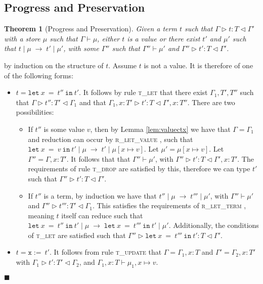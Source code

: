 \documentclass{article}
\newtheorem{thm}{Theorem}
\newcommand{\lemref}[1]{Lemma \ref{#1}}
\newcommand{\rlett}{\textsc{r\_let\_term} }
\newcommand{\rletv}{\textsc{r\_let\_value} }
\newcommand{\tlet}{\textsc{t\_let} }
\newcommand{\tupd}{\textsc{t\_update} }
\newcommand{\tdrop}{\textsc{t\_drop} }
\newcommand{\typerule}[4]{#1 \triangleright #2 : #3 \triangleleft #4}
\newcommand{\oprule}[4]{#1 \mid #2\;\longrightarrow\;#3 \mid #4}
\newcommand{\lett}[3]{\mathtt{let}\:#1\:\mathtt{=}\:#2\:\mathtt{in}\:#3}
\newcommand{\qed}{$\blacksquare$}
\newenvironment{proof}{\vspace{1ex}\noindent{\bf Proof}\hspace{0.5em}}
  {\hfill\qed\vspace{1ex}}
\begin{document}
\subsection{Progress and Preservation}

\begin{thm}[Progress and Preservation]
Given a term $t$ such that $\typerule{\Gamma}{t}{T}{\Gamma'}$
with a store $\mu$ such that $\Gamma \vdash \mu$, either $t$ is a value or 
there exist $t'$ and $\mu'$ such that
$\oprule{t}{\mu}{t'}{\mu'}$, with some $\Gamma''$ such that
$\Gamma'' \vdash \mu'$ and $\typerule{\Gamma''}{t'}{T}{\Gamma'}$.
\end{thm}

\begin{proof}
by induction on the structure of $t$. Assume $t$ is not a value. It is
therefore of one of the following forms:

\begin{itemize}
\item $t = \lett{x}{t''}{t'}$. 
It follows by rule \tlet that there exist $\Gamma_1, T', T''$
such that
$\typerule{\Gamma}{t''}{T'}{\Gamma_1}$ and that
$\typerule{\Gamma_1, x : T'}{t'}{T}{\Gamma', x : T''}$. There are two
possibilities:

	\begin{itemize}
	\item If $t''$ is some value $v$, then by \lemref{lem:valuectx} 
	we have that $\Gamma = \Gamma_1$ and reduction can occur
	by \rletv, such that 
	$\oprule{\lett{x}{v}{t'}}{\mu}{t'}{\mu [ x \mapsto v ]}$.
	Let $\mu' = \mu [ x \mapsto v ]$. Let $\Gamma'' = \Gamma, x : T'$.
	It follows that that $\Gamma'' \vdash \mu'$, with
	$\typerule{\Gamma''}{t'}{T}{\Gamma', x : T'}$.
	The requirements of rule \tdrop are satisfied by this, therefore we can 
	type $t'$ such that $\typerule{\Gamma''}{t'}{T}{\Gamma'}$.

	\item If $t''$ is a term, 
	by induction we have that $\oprule{t''}{\mu}{t'''}{\mu'}$, with
	$\Gamma'' \vdash \mu'$ and $\typerule{\Gamma''}{t'''}{T'}{\Gamma_1}$.
	This satisfies the requirements of \rlett, meaning $t$ itself can reduce
	such that $\oprule{\lett{x}{t''}{t'}}{\mu}{\lett{x}{t'''}{t'}}{\mu'}$.
	Additionally, the conditions of \tlet are satisfied such that
	$\typerule{\Gamma''}{\lett{x}{t'''}{t'}}{T}{\Gamma'}$.

	\end{itemize}

\item $t = \mathtt{x :=\:}t'$. It follows from rule \tupd that $\Gamma = \Gamma_1, x : T$ 
and $\Gamma' = \Gamma_2, x : T'$ with $\typerule{\Gamma_1}{t'}{T'}{\Gamma_2}$,
and $\Gamma_1, x : T \vdash \mu_1, x \mapsto v$.


\end{itemize}
\end{proof}
\end{document}
